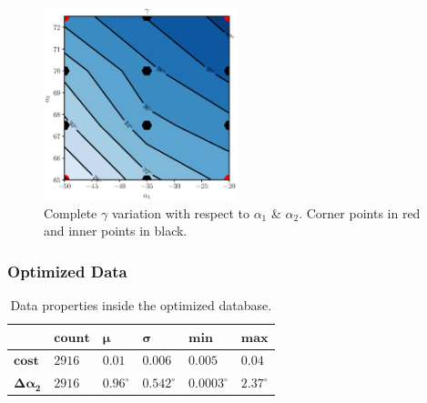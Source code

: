 \documentclass[11pt,a4paper,twocolumn]{article}
\begin{document}
\begin{figure}[!h]
    \centering
    \includegraphics[width=0.5\textwidth]{./images/staggerComplete.eps}
    \caption{Complete $\gamma$ variation with respect to $\alpha_1$ \& $\alpha_2$. Corner points in red and inner points in black.}
    \label{fig:linearInterpolationFinal}
\end{figure}

\subsubsection{Optimized Data}

\begin{table}[!h]  
    \centering
    \renewcommand{\arraystretch}{2}
    \caption{Data properties inside the optimized database.}
    \label{tab:database}
    \begin{tabularx}{0.45\textwidth} { 
        | >{\centering\arraybackslash}X 
         >{\centering\arraybackslash}X 
         >{\centering\arraybackslash}X
         >{\centering\arraybackslash}X
         >{\centering\arraybackslash}X
         >{\centering\arraybackslash}X | } 
        \hline
                                       & $\boldsymbol{count}$ & $\boldsymbol{\mu}$ & $\boldsymbol{\sigma}$ & $\boldsymbol{min}$  & $\boldsymbol{max}$ \\ \hline\hline
        $\boldsymbol{cost}$            & $2916$               & $0.01$             & $0.006$               & $0.005$             & $0.04$             \\ \hline
        $\boldsymbol{\Delta \alpha_2}$ & $2916$               & $0.96^\circ$       & $0.542^\circ$         & $0.0003^\circ$       & $2.37^\circ$       \\ \hline
    \end{tabularx}
\end{table}

\end{document}
